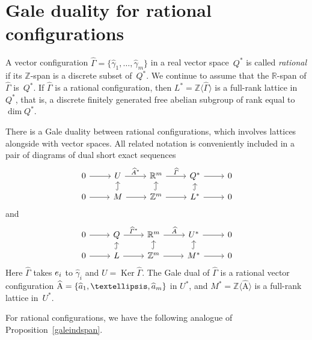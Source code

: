 \documentclass[a4paper]{amsart}
\theoremstyle{definition}
\theoremstyle{remark}
\numberwithin{equation}{section}
\def\R{\mathbb R}
\def\R{\mathbb R}
\def\Z{\mathbb Z}
\newcommand{\mb}[1]{{\textbf {\textit#1}}}
\def\Ker{\mathop{\mathrm{Ker}}}
\newcommand{\<}{\langle}
\renewcommand{\>}{\rangle}
\begin{document}
\section{Gale duality for rational configurations}\label{secgr}
A vector configuration $\widehat\Gamma=\{\widehat\gamma_1,\ldots,\widehat\gamma_m\}$ in a real vector space~$Q^*$ is called \emph{rational} if its 
$\Z$-span is a discrete subset of~$Q^*$. We continue to assume that the $\R$-span of $\widehat\Gamma$ is~$Q^*$. If $\widehat\Gamma$ is a rational configuration, then $L^*=\Z\langle\widehat\Gamma\rangle$ is a full-rank lattice in $Q^*$, that is, a discrete finitely generated free abelian subgroup of rank equal to $\dim Q^*$.

There is a Gale duality between rational configurations, which involves lattices alongside with vector spaces. All  related notation is conveniently included in a pair of diagrams of dual short exact sequences
\[
\begin{tikzcd}[row sep=small]
  0 \ar{r} & U \ar{r}{\widehat{A}^*} 
  & \R^m  \ar{r}{\widehat\varGamma} & Q^* \ar{r} & 0\\
  0 \ar{r} & M \ar{r} \ar[hook]{u} & \Z^m  \ar{r}\ar[hook]{u}  
  & L^* \ar{r}\ar[hook]{u} & 0
\end{tikzcd}
\]
and
\[
\begin{tikzcd}[row sep=small]
  0 \ar{r} & Q \ar{r}{\widehat{\varGamma}^*} 
  & \R^m  \ar{r}{\widehat A} & U^* \ar{r} & 0\\
  0 \ar{r} & L \ar{r} \ar[hook]{u} & \Z^m  \ar{r}\ar[hook]{u}  
  & M^* \ar{r}\ar[hook]{u} & 0
\end{tikzcd}
\]
Here $\widehat\varGamma$ takes $\mb e_i$ to $\widehat\gamma_i$ and $U=\Ker\widehat\varGamma$. The Gale dual of $\widehat\Gamma$ is a rational vector configuration $\widehat{\mathrm A}=\{\widehat{\mb a}_1,\ldots,\widehat{\mb a}_m\}$ in $U^*$, and $M^*=\Z\langle\widehat{\mathrm A}\rangle$ is a full-rank lattice in~$U^*$.

For rational configurations, we have the following analogue of Proposition~\ref{galeindspan}.
\end{document}
